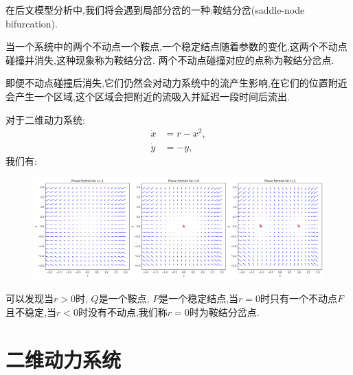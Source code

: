 在后文模型分析中,我们将会遇到局部分岔的一种:鞍结分岔(saddle-node bifurcation). 
\begin{defn}[鞍结分岔]\cite{strogatz2018nonlinear}
    当一个系统中的两个不动点一个鞍点,一个稳定结点随着参数的变化,这两个不动点碰撞并消失,这种现象称为鞍结分岔. 两个不动点碰撞对应的点称为鞍结分岔点. 
\end{defn}
即便不动点碰撞后消失,它们仍然会对动力系统中的流产生影响,在它们的位置附近会产生一个区域,这个区域会把附近的流吸入并延迟一段时间后流出\cite{strogatz2018nonlinear}. 

\begin{exmp}
    对于二维动力系统:
    \begin{equation}\label{eq01}
        \begin{aligned}
            \dot{x}&=r-x^2,\\
            \dot{y}&=-y,
        \end{aligned}
    \end{equation}
    我们有:
    \begin{figure}[H]
        \centering
        \includegraphics[width=\textwidth]{Img/saddle-node.png}
    \end{figure}
    可以发现当$r>0$时, $Q$是一个鞍点, $P$是一个稳定结点,当$r=0$时只有一个不动点$F$且不稳定,当$r<0$时没有不动点,我们称$r=0$时为鞍结分岔点. 
\end{exmp}
\section{二维动力系统}
